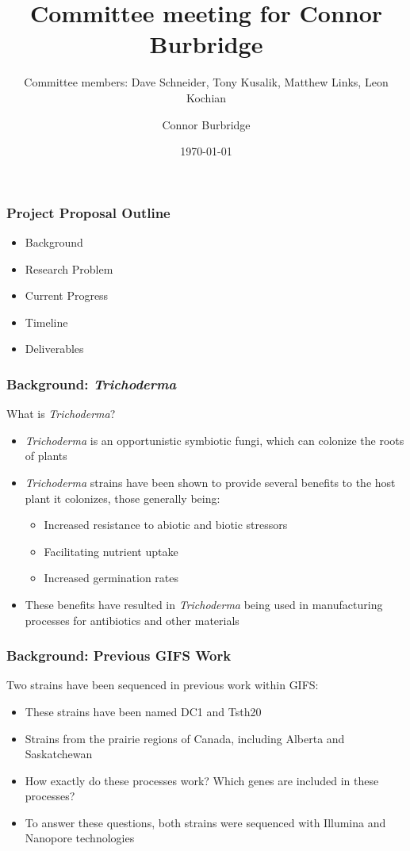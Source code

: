 \documentclass{beamer}
\title{Committee meeting for Connor Burbridge}
\subtitle{Committee members: Dave Schneider, Tony Kusalik, Matthew Links, Leon Kochian}
\author{Connor Burbridge}
\date{\today}
\begin{document}
\begin{frame}
  \titlepage
\end{frame}

\begin{frame}
  \frametitle{Project Proposal Outline}
  \begin{itemize}
  \item Background
  \item Research Problem
  \item Current Progress
  \item Timeline
  \item Deliverables
  \end{itemize}
\end{frame}

\begin{frame}
  \frametitle{Background: \textit{Trichoderma}}
  What is \textit{Trichoderma}?
  \begin{itemize}
  \item \textit{Trichoderma} is an opportunistic symbiotic fungi, which
    can colonize the roots of plants
  \item \textit{Trichoderma} strains have been shown to provide
    several benefits to the host plant it colonizes, those generally
    being:
    \begin{itemize}
      \item Increased resistance to abiotic and biotic stressors
      \item Facilitating nutrient uptake
      \item Increased germination rates
    \end{itemize}
  \item These benefits have resulted in \textit{Trichoderma} being
    used in manufacturing processes for antibiotics and other materials
  \end{itemize}
\end{frame}

\begin{frame}
  \frametitle{Background: Previous GIFS Work}
  Two strains have been sequenced in previous work within GIFS:
  \begin{itemize}
  \item These strains have been named DC1 and Tsth20
  \item Strains from the prairie regions of Canada, including Alberta
    and Saskatchewan
  \item How exactly do these processes work? Which genes are included
    in these processes?
  \item To answer these questions, both strains were sequenced with
    Illumina and Nanopore technologies
  \end{itemize}
\end{frame}
\end{document}
